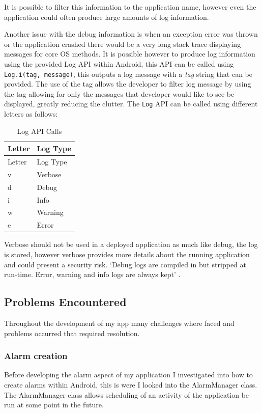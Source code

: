 It is possible to filter this information to the application name,
however even the application could often produce large amounts of log
information.

Another issue with the debug information is when an exception error was
thrown or the application crashed there would be a very long stack trace
displaying messages for core OS methods. It is possible however to
produce log information using the provided Log API within Android, this
API can be called using \lstinline!Log.i(tag, message)!, this outputs a
log message with a \emph{tag} string that can be provided. The use of
the tag allows the developer to filter log message by using the tag
allowing for only the messages that developer would like to see be
displayed, greatly reducing the clutter. The \lstinline!Log! API can be
called using different letters as follows:

\pagebreak

\begin{longtable}[]{@{}ll@{}}
\caption{Log API Calls}\tabularnewline
\toprule
Letter & Log Type\tabularnewline
\midrule
\endfirsthead
\toprule
Letter & Log Type\tabularnewline
\midrule
\endhead
v & Verbose\tabularnewline
d & Debug\tabularnewline
i & Info\tabularnewline
w & Warning\tabularnewline
e & Error\tabularnewline
\bottomrule
\end{longtable}

Verbose should not be used in a deployed application as much like debug,
the log is stored, however verbose provides more details about the
running application and could present a security risk. `Debug logs are
compiled in but stripped at run-time. Error, warning and info logs are
always kept' \parencite{androidLog}.

\subsection{Problems Encountered}\label{problems-encountered}

Throughout the development of my app many challenges where faced and
problems occurred that required resolution.

\subsubsection{Alarm creation}\label{alarm-creation}

Before developing the alarm aspect of my application I investigated into
how to create alarms within Android, this is were I looked into the
AlarmManager class. The AlarmManager class allows scheduling of an
activity of the application be run at some point in the future.


